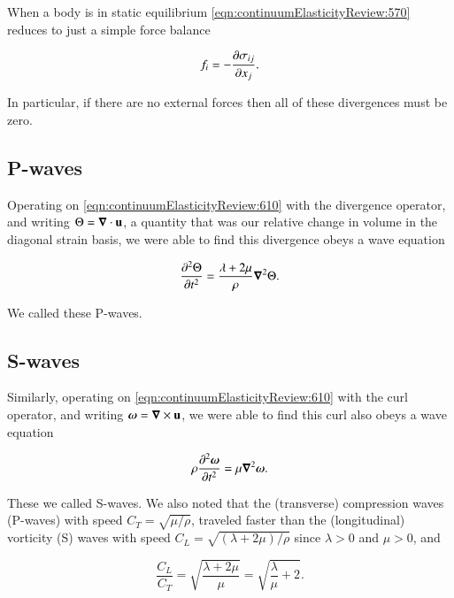 When a body is in static equilibrium \ref{eqn:continuumElasticityReview:570} reduces to just a simple force balance

\begin{equation}\label{eqn:continuumFluidsReviewXX:1090b}
f_i = - \PD{x_j}{\sigma_{ij}}.
\end{equation}

In particular, if there are no external forces then all of these divergences must be zero.  

\subsection{P-waves}

Operating on \ref{eqn:continuumElasticityReview:610} with the divergence operator, and writing $\Theta = \spacegrad \cdot \Bu$, a quantity that was our relative change in volume in the diagonal strain basis, we were able to find this divergence obeys a wave equation

\begin{equation}\label{eqn:continuumElasticityReview:630}
\PDSq{t}{\Theta} = \frac{\lambda + 2 \mu}{\rho} \spacegrad^2 \Theta.
\end{equation}

We called these P-waves.

\subsection{S-waves}

Similarly, operating on \ref{eqn:continuumElasticityReview:610} with the curl operator, and writing $\Bomega = \spacegrad \cross \Bu$, we were able to find this curl also obeys a wave equation

\begin{equation}\label{eqn:continuumElasticityReview:650}
\rho \PDSq{t}{\Bomega} = \mu \spacegrad^2 \Bomega.
\end{equation}

These we called S-waves.  We also noted that the (transverse) compression waves (P-waves) with speed $C_T = \sqrt{\mu/\rho}$, traveled faster than the (longitudinal) vorticity (S) waves with speed $C_L = \sqrt{(\lambda + 2 \mu)/\rho}$ since $\lambda > 0$ and $\mu > 0$, and 

\begin{equation}\label{eqn:continuumElasticityReview:670}
\frac{C_L}{C_T} = \sqrt{\frac{ \lambda + 2 \mu}{\mu}} = \sqrt{ \frac{\lambda}{\mu} + 2}.
\end{equation}

